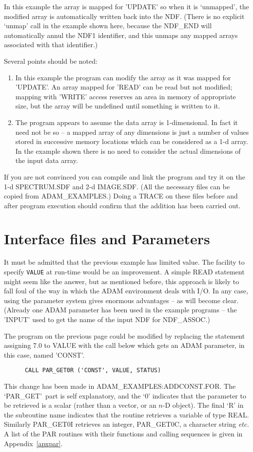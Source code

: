 In this example the array is mapped for 'UPDATE' so when it is 
`unmapped', the modified array is automatically written back into the NDF.
(There is no explicit `unmap' call in the example shown here, 
because the NDF\_END will automatically 
annul the NDF1 identifier, and this
unmaps any mapped arrays associated with that identifier.)

Several points should be noted:
\begin{enumerate}
\item In this example the program can modify the array as it was mapped for 
'UPDATE'.
An array mapped for 'READ' can  be read but not modified;
mapping with  'WRITE' access reserves an area in memory of appropriate
size, but the array will be undefined until something is written to it.
\item The program appears to assume the data array is 1-dimensional.
In fact it need not be so -- a mapped array of any dimensions is just
a number of values stored in successive memory locations which  can
be considered as a 1-d array.
In the example shown there is no need to consider the actual dimensions 
of the input data array. 
\end{enumerate}
If you are not convinced you can compile and link the program and try it
on the 1-d SPECTRUM.SDF and 2-d IMAGE.SDF.  (All the necessary files can be
copied from ADAM\_EXAMPLES.)
Doing a TRACE on these files before and after program execution should
confirm that the addition has been carried out.

\newpage
\section{Interface files and Parameters\label{addconst}}

It must be admitted that the previous example has limited value.
The facility to specify {\tt VALUE} at run-time
would be an improvement.
A simple READ statement might seem like the answer, but as mentioned before,
this approach
is likely to fall foul of the way in which the 
ADAM environment deals with I/O.
In any case, using the parameter system gives enormous advantages -- as will
become clear.
(Already one ADAM parameter has been used in the example programs -- the 
'INPUT'  used to get the name of the input NDF for NDF\_ASSOC.)

The program on the previous page could be modified by replacing the 
statement assigning 7.0 to VALUE with the call below which gets an 
ADAM parameter, in this case, named 'CONST'.
\begin{verbatim}
      CALL PAR_GET0R ('CONST', VALUE, STATUS)
\end{verbatim}
This change has been made in ADAM\_EXAMPLES:ADDCONST.FOR.
The `PAR\_GET'\ part is self explanatory,  and the `0' indicates that 
the parameter to be retrieved is a scalar 
(rather than a vector, or an $n$-D object).
The final `R' in the subroutine 
name indicates that the routine retrieves a variable of type REAL.
Similarly PAR\_GET0I retrieves an integer, PAR\_GET0C, a character 
string {\it etc.}
A list of the PAR routines with their functions and calling 
sequences is given in Appendix~\ref{apxpar}.


